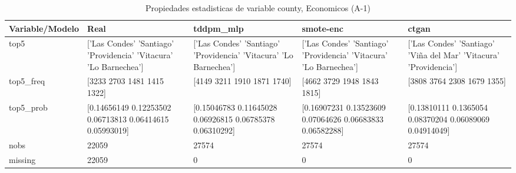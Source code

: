 \begin{table}[H]
\centering
\fontsize{8}{14}\selectfont
\caption{Propiedades  estadisticas de variable county, Economicos (A-1)}
\label{table-stats-economicos-a-1-county}
\begin{tabular}{|l|m{10em}|m{10em}|m{10em}|m{10em}|}
\hline
 \rowcolor[gray]{0.8}
Variable/Modelo & Real & tddpm\_mlp & smote-enc & ctgan \\
\hline top5 & ['Las Condes' 'Santiago' 'Providencia' 'Vitacura' 'Lo Barnechea'] & ['Las Condes' 'Santiago' 'Providencia' 'Vitacura' 'Lo Barnechea'] & ['Las Condes' 'Santiago' 'Providencia' 'Vitacura' 'Lo Barnechea'] & ['Las Condes' 'Santiago' 'Viña del Mar' 'Vitacura' 'Providencia'] \\
\hline top5\_freq & [3233 2703 1481 1415 1322] & [4149 3211 1910 1871 1740] & [4662 3729 1948 1843 1815] & [3808 3764 2308 1679 1355] \\
\hline top5\_prob & [0.14656149 0.12253502 0.06713813 0.06414615 0.05993019] & [0.15046783 0.11645028 0.06926815 0.06785378 0.06310292] & [0.16907231 0.13523609 0.07064626 0.06683833 0.06582288] & [0.13810111 0.1365054  0.08370204 0.06089069 0.04914049] \\
\hline nobs & 22059 & 27574 & 27574 & 27574 \\
\hline missing & 22059 & 0 & 0 & 0 \\
\hline
\end{tabular}
\end{table}
